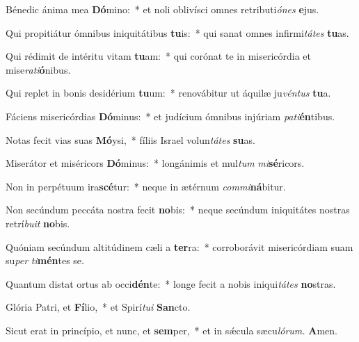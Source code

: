 \item Bénedic ánima mea \textbf{Dó}mino:~* et noli oblivísci omnes retributi\hspace{0.03em}\textit{ónes} \textbf{e}jus.
\item Qui propitiátur ómnibus iniquitátibus \textbf{tu}is:~* qui sanat omnes infirmi\hspace{0.03em}\textit{tátes} \textbf{tu}as.
\item Qui rédimit de intéritu vitam \textbf{tu}am:~* qui corónat te in misericórdia et mise\hspace{0.03em}\textit{rati}\textbf{ó}nibus.
\item Qui replet in bonis desidérium \textbf{tu}um:~* renovábitur ut áquilæ ju\textit{véntus} \textbf{tu}a.
\item Fáciens misericórdias \textbf{Dó}minus:~* et judícium ómnibus injúriam \textit{pati}\textbf{én}tibus.
\item Notas fecit vias suas \textbf{Mó}ysi,~* fíliis Israel volun\hspace{0.03em}\textit{tátes} \textbf{su}as.
\item Miserátor et miséricors \textbf{Dó}minus:~* longánimis et mul\textit{tum} \textit{mi}\textbf{sé}ricors.
\item Non in perpétuum ira\textbf{scé}tur:~* neque in ætérnum \textit{commi}\textbf{ná}bitur.
\item Non secúndum peccáta nostra fecit \textbf{no}bis:~* neque secúndum iniquitátes nostras retrí\textit{buit} \textbf{no}bis.
\item Quóniam secúndum altitúdinem cæli a \textbf{ter}ra:~* corroborávit misericórdiam suam su\textit{per} \textit{ti}\textbf{mén}tes se.
\item Quantum distat ortus ab occi\textbf{dén}te:~* longe fecit a nobis iniqui\textit{tátes} \textbf{no}stras.
\item Glória Patri, et \textbf{Fí}lio,~* et Spirí\hspace{0.03em}\textit{tui} \textbf{San}cto.
\item Sicut erat in princípio, et nunc, et \textbf{sem}per,~* et in sǽcula sæcu\hspace{0.03em}\textit{lórum.} \textbf{A}men.
